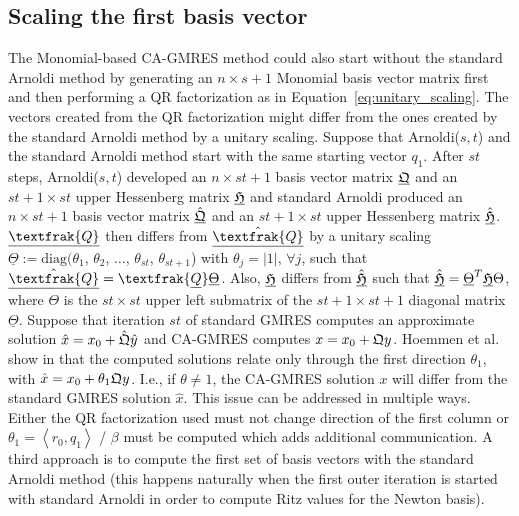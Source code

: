 \documentclass{scrartcl}
\numberwithin{equation}{section}
\begin{document}
\subsection{Scaling the first basis vector} \label{sec:scaling_first_basis_vec}
The Monomial-based CA-GMRES method could also start without the standard Arnoldi method by generating an $n \times s + 1$ Monomial basis vector matrix first and then performing a QR factorization as in Equation~\eqref{eq:unitary_scaling}. The vectors created from the QR factorization might differ from the ones created by the standard Arnoldi method by a unitary scaling. Suppose that Arnoldi($s,t$) and the standard Arnoldi method start with the same starting vector $q_1$. After $st$ steps, Arnoldi($s,t$) developed an $n \times st + 1$ basis vector matrix $\underline{\frak{Q}}$ and an $st + 1 \times st$ upper Hessenberg matrix $\underline{\frak{H}}$ and standard Arnoldi produced an $n \times st + 1$ basis vector matrix $\underline{\hat{\frak{Q}}}$ and an $st + 1 \times st$ upper Hessenberg matrix $\underline{\hat{\frak{H}}}$. $\underline{\textfrak{Q}}$ then differs from $\underline{\hat{\textfrak{Q}}}$ by a unitary scaling $\underline{\Theta} := \text{diag}(\theta_1$, $\theta_2$, $\ldots$, $\theta_{st}$, $\theta_{st+1}$) with $\theta_j = |1|$,  $\forall j$, such that $\underline{\hat{\textfrak{Q}}} = \textfrak{\underline{Q}}\underline{\Theta}$. Also, $\underline{\frak{H}}$ differs from $\underline{\hat{\frak{H}}}$ such that $\hat{\underline{\frak{H}}} = \underline{\Theta}^T \underline{\frak{H}} \Theta$, where $\Theta$ is the $st \times st$ upper left submatrix of the $st + 1 \times st + 1$ diagonal matrix $\underline{\Theta}$. Suppose that iteration $st$ of standard GMRES computes an approximate solution $\textcolor{darkcyan}{\hat{x}} = x_0 + \color{darkcyan}\hat{\frak{Q}} \hat{y}$ and CA-GMRES computes $\textcolor{magenta}x = x_0 + \color{magenta}\frak{Q} y$. Hoemmen et al. show in \cite{Hoemmen:2010:CKS:1970638} that the computed solutions relate only through the first direction $\theta_1$, with $\textcolor{darkcyan}{\hat{x}} = x_0 + \theta_1 \color{magenta}\frak{Q}y$. I.e., if $\theta \ne 1$, the CA-GMRES solution $x$ will differ from the standard GMRES solution $\hat{x}$.
This issue can be addressed in multiple ways. Either the QR factorization used must not change direction of the first column or $\theta_1 = \left< r_0, q_1 \right>$ / $\beta$ must be computed which adds additional communication. A third approach is to compute the first set of basis vectors with the standard Arnoldi method (this happens naturally when the first outer iteration is started with standard Arnoldi in order to compute Ritz values for the Newton basis).
\end{document}
